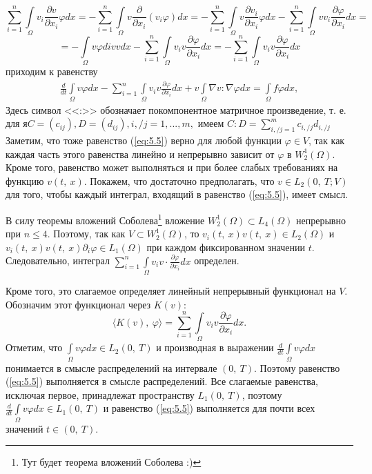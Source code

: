 $$\sum_{i=1}^{n}\int\limits_\Omega v_i\frac{\partial v}{\partial x_i}\varphi dx=-\sum_{i=1}^{n}\int\limits_\Omega v\frac{\partial}{\partial x_i}(v_i\varphi)dx=
-\sum_{i=1}^{n}\int\limits_\Omega v\frac{\partial v_i}{\partial x_i}\varphi dx-\sum_{i=1}^{n}\int\limits_\Omega vv_i\frac{\partial\varphi}{\partial x_i} dx=$$
$$=-\int\limits_\Omega v\varphi div v dx-\sum_{i=1}^{n}\int\limits_\Omega v_i v\frac{\partial\varphi}{\partial x_i}dx=
-\sum_{i=1}^{n}\int\limits_\Omega v_i v\frac{\partial\varphi}{\partial x_i}dx$$
приходим к равенству
\begin{equation}\label{eq:5.5}
    \begin{gathered}
        \frac{d}{dt}\int\limits_\Omega v \varphi dx-\sum_{i=1}^{n}\int\limits_\Omega v_i v
        \frac{\partial \varphi }{\partial x_i}dx + v\int\limits_\Omega \nabla v :\nabla\varphi dx
        =\int\limits_\Omega f\varphi dx,
    \end{gathered}
\end{equation}
Здесь символ <<:>> обозначает покомпонентное матричное произведение, т. е. для $я C=(c_{ij}), D=(d_{ij}), i, / j=1,...,m,$ имеем $C:D=\sum_{i, / j=1}^{m} c_{i, / j}d_{i, / j}$
Заметим, что тоже равенство (\ref{eq:5.5}) верно для любой функции $\varphi\in V$, так как каждая часть этого равенства линейно и непрерывно зависит от
$\varphi$ в $W^{1}_{2}(\Omega)$. Кроме того, равенство может выполняться и при более слабых требованиях на функцию $v(t, \ x)$.
Покажем, что достаточно предполагать, что $v\in L_2(0, \ T;V)$ для того, чтобы каждый интеграл, входящий в равенство (\ref{eq:5.5}), имеет смысл.

В силу теоремы вложений Соболева\footnote{Тут будет теорема вложений Соболева :)} вложение $W^{1}_{2}(\Omega)\subset L_4(\Omega)$ непрерывно при $n \leqslant 4$.
Поэтому, так как $V\subset W^{1}_{2}(\Omega)$, то $v_i(t, \ x)v(t, \ x)\in L_2(\Omega)$ и $v_i(t, \ x)v(t, \ x)\partial_i\varphi \in L_1(\Omega)$
при каждом фиксированном значении $t$. Следовательно, интеграл $\sum_{i=1}^{n}\int\limits_\Omega v_iv\cdot\frac{\partial\varphi}{\partial x_i}dx$ определен.

Кроме того, это слагаемое определяет линейный непрерывный функционал на $V$. Обозначим этот функционал через $K(v)$:
$$\langle K(v), \ \varphi \rangle = \sum_{i=1}^{n}\int\limits_\Omega v_i v \frac{\partial \varphi}{\partial x_i}dx.$$
Отметим, что $\int\limits_\Omega v \varphi dx\in L_2(0, \ T)$ и производная в выражении \linebreak
$\frac{d}{dt}\int\limits_\Omega v \varphi dx$
понимается в смысле распределений на интервале $(0, \ T)$. Поэтому равенство (\ref{eq:5.5}) выполняется в смысле распределений.
Все слагаемые равенства, исключая первое, принадлежат пространству $L_1(0, \ T)$, поэтому $\frac{d}{dt}\int\limits_\Omega v \varphi dx\in L_1(0, \ T)$
и равенство (\ref{eq:5.5}) выполняется для почти всех значений $t\in (0, \ T)$.

